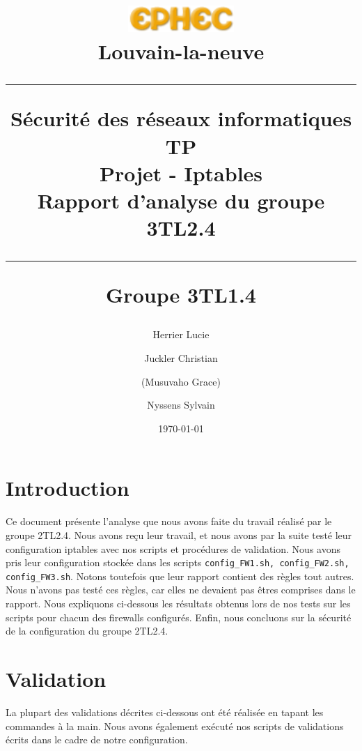 \documentclass[11pt,a4paper]{article}
\title{
\parbox{15cm}
{\includegraphics[width=4cm]{ephec.png} \\ 
  Louvain-la-neuve\\
  \vspace{3cm}
	\begin{center}\sf\bfseries\Huge
		\rule{15cm}{1pt}
		\medskip
		Sécurité des réseaux informatiques TP \\
		\huge Projet - Iptables\\
		\vspace{.5cm}
		\Large Rapport d'analyse du groupe 3TL2.4
		\vspace{.5cm}
		\rule{15cm}{1pt}
		\large Groupe 3TL1.4
	\end{center}
	\vspace{3cm}
}}
\author{Herrier Lucie \and Juckler Christian \and (Musuvaho Grace) \and Nyssens Sylvain}
\date{\today}
\begin{document}
\maketitle
\newpage
\section{Introduction}
Ce document présente l'analyse que nous avons faite du travail réalisé par le groupe 2TL2.4. Nous avons reçu leur travail, et nous avons par la suite testé leur configuration iptables avec nos scripts et procédures de validation. Nous avons pris leur configuration stockée dans les scripts \texttt{config\_FW1.sh, config\_FW2.sh, config\_FW3.sh}. Notons toutefois que leur rapport contient des règles tout autres. Nous n'avons pas testé ces règles, car elles ne devaient pas êtres comprises dans le rapport. Nous expliquons ci-dessous les résultats obtenus lors de nos tests sur les scripts pour chacun des firewalls configurés. Enfin, nous concluons sur la sécurité de la configuration du groupe 2TL2.4.


\section{Validation}
La plupart des validations décrites ci-dessous ont été réalisée en tapant les commandes à la main. Nous avons également exécuté nos scripts de validations écrits dans le cadre de notre configuration.
\end{document}
